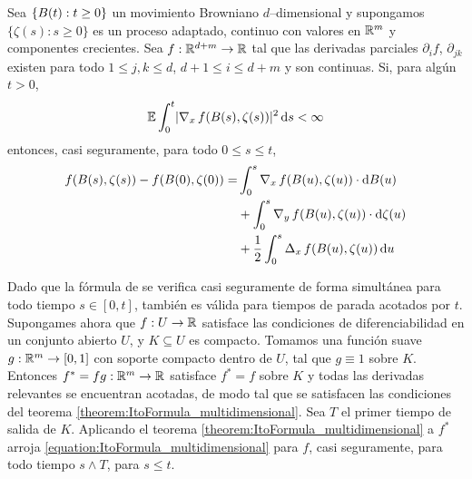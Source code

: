 \begin{theorem}
  \label{theorem:ItoFormula_multidimensional}
  Sea \(\{B(t) : t \geq 0\}\) un movimiento Browniano \(d\)--dimensional y supongamos \(\{\zeta(s) : s \geq 0\}\) es un proceso adaptado, continuo con valores en \(\mathbb{R}^m\) y componentes crecientes.
  Sea \(f : \mathbb{R}^{d + m} \rightarrow \mathbb{R}\) tal que las derivadas parciales \(\partial_i f\), \(\partial_{j k}\) existen para todo \(1 \leq j, k \leq d\), \(d + 1 \leq i \leq d + m\) y son continuas.
  Si, para algún \(t > 0\),
  \begin{align}
    \operatorname{\mathbb{E}} \int_0^t \lvert\operatorname{\nabla}_x f(B(s), \zeta(s))\rvert^2 \mathop{}\!\mathrm{d} s
    <
    \infty
  \end{align}
  entonces, casi seguramente, para todo \(0 \leq s \leq t\),
  \begin{align}
    f(B(s), \zeta(s)) - f(B(0), \zeta(0))
    =
    &\int_0^s \operatorname{\nabla}_x f(B(u), \zeta(u)) \cdot \mathop{}\!\mathrm{d} B(u)
    \nonumber
    \\
    &+ \int_0^s \operatorname{\nabla}_y f(B(u), \zeta(u)) \cdot \mathop{}\!\mathrm{d} \zeta(u)
    \nonumber
    \\
    &+ \frac{1}{2} \int_0^s \operatorname{\Delta}_x f(B(u), \zeta(u)) \mathop{}\!\mathrm{d} u
    \label{equation:ItoFormula_multidimensional}
  \end{align}
  \begin{remark}
    Dado que la fórmula de \ito se verifica casi seguramente de forma simultánea para todo tiempo \(s \in [0, t]\), también es válida para tiempos de parada acotados por \(t\).
    Supongames ahora que \(f : U \rightarrow \mathbb{R}\) satisface las condiciones de diferenciabilidad en un conjunto abierto \(U\), y \(K \subseteq U\) es compacto.
    Tomamos una función suave \(g : \mathbb{R}^m \rightarrow [0, 1]\) con soporte compacto dentro de \(U\), tal que \(g \equiv 1\) sobre \(K\).
    Entonces \(f^* = f g : \mathbb{R}^m \rightarrow \mathbb{R}\) satisface \(f^* = f\) sobre \(K\) y todas las derivadas relevantes se encuentran acotadas, de modo tal que se satisfacen las condiciones del teorema \ref{theorem:ItoFormula_multidimensional}.
    Sea \(T\) el primer tiempo de salida de \(K\).
    Aplicando el teorema \ref{theorem:ItoFormula_multidimensional} a \(f^*\) arroja \eqref{equation:ItoFormula_multidimensional} para \(f\), casi seguramente, para todo tiempo \(s \wedge T\), para \(s \leq t\).
  \end{remark}
\end{theorem}

